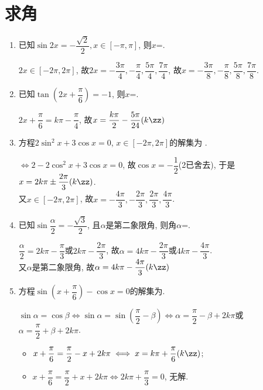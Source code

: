 \section{求角}
\begin{enumerate}
\item 已知$\sin2x=-\dfrac{\sqrt2}{2}, x\in[-\pi,\pi]$, 则$x$=. 
\begin{jieda}
$2x\in[-2\pi,2\pi]$, 故$2x=-\dfrac{3\pi}{4},-\dfrac{\pi}{4},\dfrac{5\pi}{4},\dfrac{7\pi}{4}$, 
故$x=-\dfrac{3\pi}{8},-\dfrac{\pi}{8},\dfrac{5\pi}{8},\dfrac{7\pi}{8}$. 
\end{jieda}

\item 已知$\tan\left(2x+\dfrac{\pi}{6}\right)=-1$, 则$x$=. 
\begin{jieda}
$2x+\dfrac{\pi}{6}=k\pi-\dfrac{\pi}{4}$, 故$x=\dfrac{k\pi}{2}-\dfrac{5\pi}{24}(k\zz)$
\end{jieda}


\item 方程$2\sin^2x+3\cos{x}=0$, $x\in[-2\pi,2\pi]$的解集为 .
\begin{jieda}
$\iff 2-2\cos^2x+3\cos{x}=0$, 故$\cos{x}=-\dfrac{1}{2}$(2已舍去), 于是$x=2k\pi\pm\dfrac{2\pi}{3}(k\zz)$. \\
又$x\in[-2\pi,2\pi]$, 故$x=-\dfrac{4\pi}{3},-\dfrac{2\pi}{3},\dfrac{2\pi}{3},\dfrac{4\pi}{3}$. 
\end{jieda}

\item 已知$\sin\dfrac{\alpha}{2}=-\dfrac{\sqrt{3}}{2}$, 且$\alpha$是第二象限角, 则角$\alpha$=. 
\begin{jieda}
$\dfrac{\alpha}{2}=2k\pi-\dfrac{\pi}{3}$或$2k\pi-\dfrac{2\pi}{3}$, 故$\alpha=4k\pi-\dfrac{2\pi}{3}$或$4k\pi-\dfrac{4\pi}{3}$. \\
又$\alpha$是第二象限角, 故$\alpha=4k\pi-\dfrac{4\pi}{3}(k\zz)$
\end{jieda}


\item 方程$\sin\left(x+\dfrac{\pi}{6}\right)-\cos{x}=0$的解集为. 
\begin{jieda}
$\sin\alpha=\cos\beta\iff \sin\alpha=\sin\left(\dfrac{\pi}{2}-\beta\right)\iff
\alpha=\dfrac{\pi}{2}-\beta+2k\pi$或$\alpha=\dfrac{\pi}{2}+\beta+2k\pi$. 
\begin{itemize}
\item $x+\dfrac{\pi}{6}=\dfrac{\pi}{2}-x+2k\pi\iff x=k\pi+\dfrac{\pi}{6}(k\zz)$; 
\item $x+\dfrac{\pi}{6}=\dfrac{\pi}{2}+x+2k\pi\iff 2k\pi+\dfrac{\pi}{3}=0$, 无解. 
\end{itemize}
\end{jieda}



\end{enumerate}
